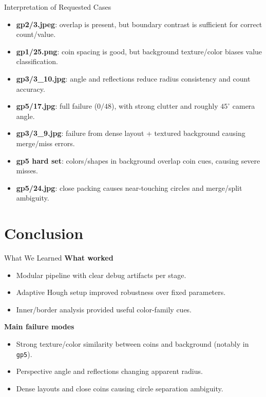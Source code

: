 \documentclass[aspectratio=169]{beamer}
\begin{document}
\begin{frame}{Interpretation of Requested Cases}
  \begin{itemize}
    \item \textbf{gp2/3.jpeg}: overlap is present, but boundary contrast is sufficient for correct count/value.
    \item \textbf{gp1/25.png}: coin spacing is good, but background texture/color biases value classification.
    \item \textbf{gp3/3\_10.jpg}: angle and reflections reduce radius consistency and count accuracy.
    \item \textbf{gp5/17.jpg}: full failure (\(0/48\)), with strong clutter and roughly \(45^\circ\) camera angle.
    \item \textbf{gp3/3\_9.jpg}: failure from dense layout + textured background causing merge/miss errors.
    \item \textbf{gp5 hard set}: colors/shapes in background overlap coin cues, causing severe misses.
    \item \textbf{gp5/24.jpg}: close packing causes near-touching circles and merge/split ambiguity.
  \end{itemize}
\end{frame}

\section{Conclusion}

\begin{frame}{What We Learned}
  \textbf{What worked}
  \begin{itemize}
    \item Modular pipeline with clear debug artifacts per stage.
    \item Adaptive Hough setup improved robustness over fixed parameters.
    \item Inner/border analysis provided useful color-family cues.
  \end{itemize}

  \textbf{Main failure modes}
  \begin{itemize}
    \item Strong texture/color similarity between coins and background (notably in \texttt{gp5}).
    \item Perspective angle and reflections changing apparent radius.
    \item Dense layouts and close coins causing circle separation ambiguity.
  \end{itemize}
\end{frame}
\end{document}
